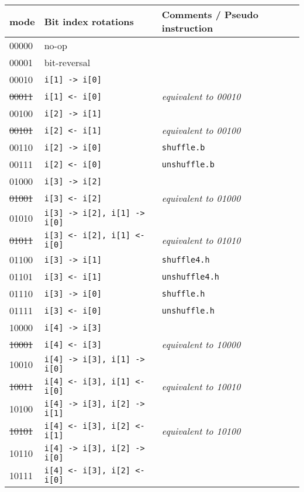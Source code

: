 \begin{table}[h]
\begin{small}
\begin{center}
\begin{tabular}{l l l}
      mode   & Bit index rotations              & Comments / Pseudo instruction \\ \hline

      00000  & no-op                            & \\
      00001  & bit-reversal                     & \\
      00010  & {\tt i[1] -> i[0]}               & \\
\sout{00011} & {\tt i[1] <- i[0]}               & {\it equivalent to 00010} \\
      00100  & {\tt i[2] -> i[1]}               & \\
\sout{00101} & {\tt i[2] <- i[1]}               & {\it equivalent to 00100} \\
      00110  & {\tt i[2] -> i[0]}               & {\tt shuffle.b} \\
      00111  & {\tt i[2] <- i[0]}               & {\tt unshuffle.b} \\

\hline

      01000  & {\tt i[3] -> i[2]}               & \\
\sout{01001} & {\tt i[3] <- i[2]}               & {\it equivalent to 01000} \\
      01010  & {\tt i[3] -> i[2], i[1] -> i[0]} & \\
\sout{01011} & {\tt i[3] <- i[2], i[1] <- i[0]} & {\it equivalent to 01010} \\
      01100  & {\tt i[3] -> i[1]}               & {\tt shuffle4.h} \\
      01101  & {\tt i[3] <- i[1]}               & {\tt unshuffle4.h} \\
      01110  & {\tt i[3] -> i[0]}               & {\tt shuffle.h} \\
      01111  & {\tt i[3] <- i[0]}               & {\tt unshuffle.h} \\

\hline

      10000  & {\tt i[4] -> i[3]}               & \\
\sout{10001} & {\tt i[4] <- i[3]}               & {\it equivalent to 10000} \\
      10010  & {\tt i[4] -> i[3], i[1] -> i[0]} & \\
\sout{10011} & {\tt i[4] <- i[3], i[1] <- i[0]} & {\it equivalent to 10010} \\
      10100  & {\tt i[4] -> i[3], i[2] -> i[1]} & \\
\sout{10101} & {\tt i[4] <- i[3], i[2] <- i[1]} & {\it equivalent to 10100} \\
      10110  & {\tt i[4] -> i[3], i[2] -> i[0]} & \\
      10111  & {\tt i[4] <- i[3], i[2] <- i[0]} & \\


\end{tabular}
\end{center}
\end{small}
\end{table}
